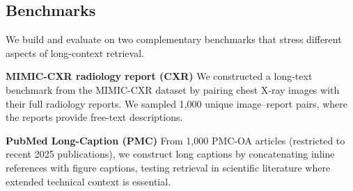 \subsection{Benchmarks}
We build and evaluate on two complementary benchmarks that stress different aspects of long-context retrieval.   

\noindent \textbf{MIMIC-CXR radiology report (CXR)}
We constructed a long-text benchmark from the MIMIC-CXR dataset \cite{mimic} by pairing chest X-ray images with their full radiology reports. We sampled 1,000 unique image–report pairs, where the reports provide free-text descriptions.


\noindent \textbf{PubMed Long-Caption (PMC)}
From 1,000 PMC-OA articles (restricted to recent 2025 publications), we construct long captions by concatenating inline references with figure captions, testing retrieval in scientific literature where extended technical context is essential.




